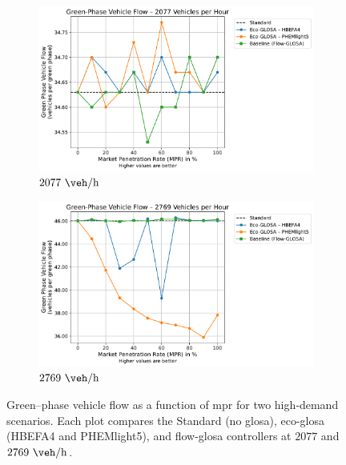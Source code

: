 \begin{figure}[htb]
  \centering
  \begin{subfigure}[t]{0.98\textwidth}
    \includegraphics[width=\textwidth]{data/img/GreenPhaseVehicleFlow/GreenPhaseVehicleFlow_Cars1500.pdf}
    \caption{$2077~\unit{\veh\per\hour}$}
    \label{fig:flow_2077}
  \end{subfigure}\hfill
  \begin{subfigure}[t]{0.98\textwidth}
    \includegraphics[width=\textwidth]{data/img/GreenPhaseVehicleFlow/GreenPhaseVehicleFlow_Cars2000.pdf}
    \caption{$2769~\unit{\veh\per\hour}$}
    \label{fig:flow_2769}
  \end{subfigure}
  \caption[Green–phase vehicle flow vs. \ac{mpr} at $2077$ and $2769~\unit{\veh\per\hour}$]{%
    Green–phase vehicle flow as a function of \ac{mpr} for two high‐demand scenarios. Each plot compares the Standard (no \ac{glosa}), \ac{eco-glosa} (HBEFA4 and PHEMlight5), and \ac{flow-glosa} controllers at $2077$ and $2769~\unit{\veh\per\hour}$.%
  }
  \label{fig:combined_flow}
\end{figure}

